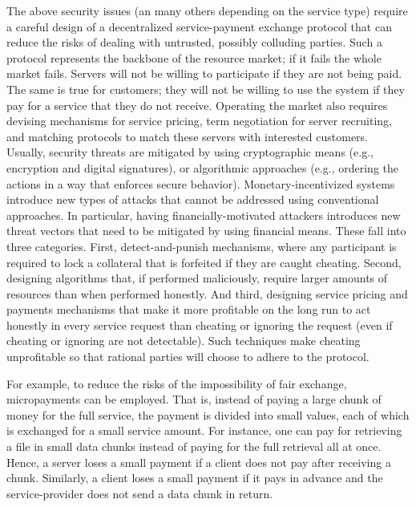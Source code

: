\documentclass{llncs}
\begin{document}
The above security issues (an many others depending on the service type) require a careful design of a decentralized service-payment exchange protocol that can reduce the risks of dealing with untrusted, possibly colluding parties. Such a protocol represents the backbone of the resource market; if it fails the whole market fails. Servers will not be willing to participate if they are not being paid. The same is true for customers; they will not be willing to use the system if they pay for a service that they do not receive. Operating the market also requires devising mechanisms for service pricing, term negotiation for server recruiting, and matching protocols to match these servers with interested customers. \\


\vspace{-4pt}
 Usually, security threats are mitigated by using cryptographic means (e.g., encryption and digital signatures), or algorithmic approaches (e.g., ordering the actions in a way that enforces secure behavior). Monetary-incentivized systems introduce new types of attacks that cannot be addressed using conventional approaches. In particular, having financially-motivated attackers introduces new threat vectors that need to be mitigated by using financial means. These fall into three categories. First, detect-and-punish mechanisms, where any participant is required to lock a collateral that is forfeited if they are caught cheating. Second, designing algorithms that, if performed maliciously, require larger amounts of resources than when performed honestly. And third, designing service pricing and payments mechanisms that make it more profitable on the long run to act honestly in every service request than cheating or ignoring the request (even if cheating or ignoring are not detectable). Such techniques make cheating unprofitable so that rational parties will choose to adhere to the protocol.


For example, to reduce the risks of the impossibility of fair exchange, micropayments can be employed. That is, instead of paying a large chunk of money for the full service, the payment is divided into small values, each of which is exchanged for a small service amount. For instance, one can pay for retrieving a file in small data chunks instead of paying for the full retrieval all at once. Hence, a server loses a small payment if a client does not pay after receiving a chunk. Similarly, a client loses a small payment if it pays in advance and the service-provider does not send a data chunk in return.
\end{document}
